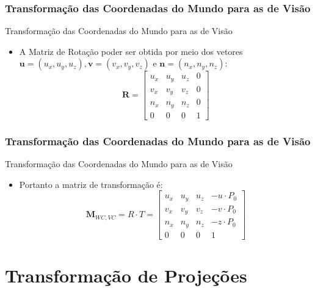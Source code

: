 \documentclass{beamer}
\begin{document}
\begin{frame}
\frametitle{Transformação das Coordenadas do Mundo para as de Visão}
	\begin{block}{Transformação das Coordenadas do Mundo para as de Visão}
		\begin{itemize}
			\item A Matriz de Rotação poder ser obtida por meio dos vetores $\textbf{u}=(u_x,u_y,u_z),\textbf{v}=(v_x,v_y,v_z)$ e $\textbf{n}=(n_x,n_y,n_z)$:
			\begin{equation*}
				\textbf{R} = \begin{bmatrix}
					u_x	&	u_y	&	u_z	&	0	\\
					v_x	&	v_y	&	v_z	&	0	\\
					n_x	&	n_y	&	n_z	&	0	\\
					0	&	0	&	0	&	1
				\end{bmatrix}
			\end{equation*}
		\end{itemize}
	\end{block}
\end{frame}


\begin{frame}
\frametitle{Transformação das Coordenadas do Mundo para as de Visão}
	\begin{block}{Transformação das Coordenadas do Mundo para as de Visão}
		\begin{itemize}
			\item Portanto a matriz de transformação é:
			\begin{equation*}
				\textbf{M}_{WC,VC} = R \cdot T  = \begin{bmatrix}
					u_x	&	u_y	&	u_z	&	-u \cdot P_0	\\
					v_x	&	v_y	&	v_z	&	-v \cdot P_0	\\
					n_x	&	n_y	&	n_z	&	-z \cdot P_0	\\
					0	&	0	&	0	&	1
				\end{bmatrix}
			\end{equation*}
		\end{itemize}
	\end{block}
\end{frame}


\section{Transformação de Projeções}
\end{document}

